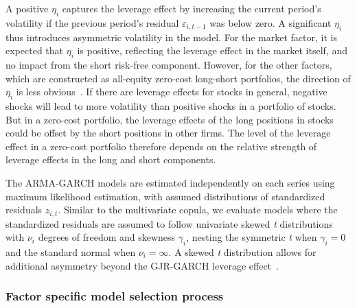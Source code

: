 A positive $\eta_i$ captures the leverage effect by increasing the current period's volatility if the previous period's residual $\varepsilon_{i,t-1}$ was below zero. A significant $\eta_i$ thus introduces asymmetric volatility in the model. For the market factor, it is expected that $\eta_i$ is positive, reflecting the leverage effect in the market itself, and no impact from the short risk-free component. However, for the other factors, which are constructed as all-equity zero-cost long-short portfolios, the direction of $\eta_i$ is less obvious~\autocite{ChristoffersenLanglois2013}. If there are leverage effects for stocks in general, negative shocks will lead to more volatility than positive shocks in a portfolio of stocks. But in a zero-cost portfolio, the leverage effects of the long positions in stocks could be offset by the short positions in other firms. The level of the leverage effect in a zero-cost portfolio therefore depends on the relative strength of leverage effects in the long and short components.

The ARMA-GARCH models are estimated independently on each series using maximum likelihood estimation, with assumed distributions of standardized residuals $z_{i,t}$. Similar to the multivariate copula, we evaluate models where the standardized residuals are assumed to follow univariate skewed \emph{t} distributions with $\nu_i$ degrees of freedom and skewness $\gamma_i$, nesting the symmetric \emph{t} when $\gamma_i = 0$ and the standard normal when $\nu_i = \infty$. A skewed \emph{t} distribution allows for additional asymmetry beyond the GJR-GARCH leverage effect~\autocite{ChristoffersenErrunzaJacobLanglois2012}.

\subsubsection{Factor specific model selection process}

